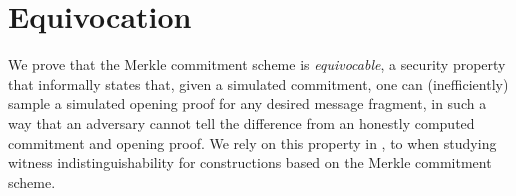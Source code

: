 \section{Equivocation}
\label{section:merkle-commitment-equivocation}

We prove that the Merkle commitment scheme is \emph{equivocable}, a security property that informally states that, given a simulated commitment, one can (inefficiently) sample a simulated opening proof for any desired message fragment, in such a way that an adversary cannot tell the difference from an honestly computed commitment and opening proof. We rely on this property in , to when studying witness indistinguishability for constructions based on the Merkle commitment scheme.

